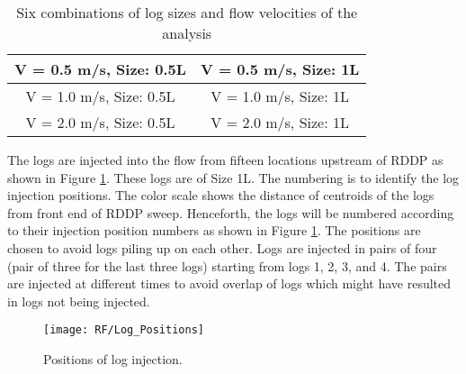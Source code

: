 \begin{table}
\centering
\caption{Six combinations of log sizes and flow velocities of the analysis}
\label{case combination}
\begin{tabular}{|c|c|}
\hline
V = 0.5 m/s, Size: 0.5L & V = 0.5 m/s, Size: 1L \\ \hline
V = 1.0 m/s, Size: 0.5L & V = 1.0 m/s, Size: 1L \\ \hline
V = 2.0 m/s, Size: 0.5L & V = 2.0 m/s, Size: 1L \\\hline
\end{tabular}
\end{table}

The logs are injected into the flow from fifteen locations upstream of RDDP as shown in Figure \ref{fig:Log_Positions}. These logs are of Size 1L. The numbering is to identify the log injection positions. The color scale shows the distance of centroids of the logs from front end of RDDP sweep. Henceforth, the logs will be numbered according to their injection position numbers as shown in Figure \ref{fig:Log_Positions}. The positions are chosen to avoid logs piling up on each other. Logs are injected in pairs of four (pair of three for the last three logs) starting from logs 1, 2, 3, and 4. The pairs are injected at different times to avoid overlap of logs which might have resulted in logs not being injected. 

\begin{figure}
\centering
\texttt{[image: RF/Log\_Positions]}
\caption{\label{fig:Log_Positions}Positions of log injection.}
\end{figure} 

\FloatBarrier
